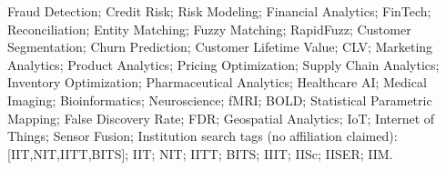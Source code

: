 {  %
  Fraud Detection; Credit Risk; Risk Modeling; Financial Analytics;
  FinTech; Reconciliation; Entity Matching; Fuzzy Matching; RapidFuzz;
  Customer Segmentation; Churn Prediction; Customer Lifetime Value;
  CLV; Marketing Analytics; Product Analytics; Pricing Optimization;
  Supply Chain Analytics; Inventory Optimization; Pharmaceutical Analytics;
  Healthcare AI; Medical Imaging; Bioinformatics; Neuroscience;
  fMRI; BOLD; Statistical Parametric Mapping; False Discovery Rate; FDR;
  Geospatial Analytics; IoT; Internet of Things; Sensor Fusion;
  Institution search tags (no affiliation claimed): [IIT,NIT,IITT,BITS];
  IIT; NIT; IITT; BITS; IIIT; IISc; IISER; IIM.%
}
